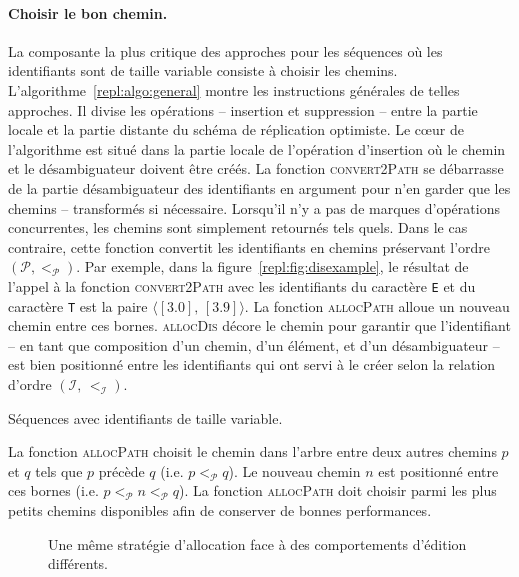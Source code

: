 \paragraph{Choisir le bon chemin.} La composante la plus critique des approches
pour les séquences où les identifiants sont de taille variable consiste à
choisir les chemins. L'algorithme~\ref{repl:algo:general} montre les
instructions générales de telles approches. Il divise les opérations --
insertion et suppression -- entre la partie locale et la partie distante du
schéma de réplication optimiste. Le cœur de l'algorithme est situé dans la
partie locale de l'opération d'insertion où le chemin et le désambiguateur
doivent être créés. La fonction \textsc{convert2Path} se débarrasse de la partie
désambiguateur des identifiants en argument pour n'en garder que les chemins --
transformés si nécessaire. Lorsqu'il n'y a pas de marques d'opérations
concurrentes, les chemins sont simplement retournés tels quels. Dans le cas
contraire, cette fonction convertit les identifiants en chemins préservant
l'ordre $(\mathcal{P}, <_\mathcal{P})$. Par exemple, dans la
figure~\ref{repl:fig:disexample}, le résultat de l'appel à la fonction
\textsc{convert2Path} avec les identifiants du caractère \texttt{E} et du
caractère \texttt{T} est la paire $\langle [3.0],\, [3.9] \rangle$. La fonction
\textsc{allocPath} alloue un nouveau chemin entre ces bornes. \textsc{allocDis}
décore le chemin pour garantir que l'identifiant -- en tant que composition d'un
chemin, d'un élément, et d'un désambiguateur -- est bien positionné entre les
identifiants qui ont servi à le créer selon la relation d'ordre
$(\mathcal{I},\, <_\mathcal{I})$.

\begin{algorithm}[h]
  
  \caption[Séquences avec identifiants de taille variable]
  {\label{repl:algo:general}Séquences avec identifiants de taille variable.}
\end{algorithm}

La fonction \textsc{allocPath} choisit le chemin dans l'arbre entre deux autres
chemins $p$ et $q$ tels que $p$ précède $q$ (i.e. $p <_\mathcal{P} q$).  Le
nouveau chemin $n$ est positionné entre ces bornes (i.e.
$p <_\mathcal{P} n <_\mathcal{P} q$). La fonction \textsc{allocPath} doit
choisir parmi les plus petits chemins disponibles afin de conserver de bonnes
performances.

\begin{figure}
  \begin{center}
  \hspace{30pt}
  \end{center}
  \caption[Une stratégie d'allocation contre les comportements d'édition] {Une
    même stratégie d'allocation face à des comportements d'édition différents.}
\end{figure}

